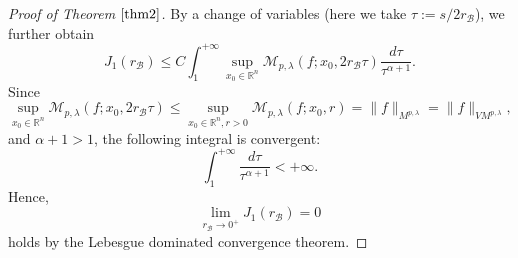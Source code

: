 \documentclass[10pt, reqno]{amsart}
\theoremstyle{definition}
\theoremstyle{remark}
\numberwithin{equation}{section}
\begin{document}
\begin{proof}[Proof of Theorem $\ref{thm2}$]
By a change of variables (here we take $\tau:=s/{2r_{\mathcal{B}}}$), we further obtain
\begin{equation*}
J_1(r_{\mathcal{B}})\leq C\int_1^{+\infty}\sup_{x_0\in\mathbb R^n}\mathcal{M}_{p,\lambda}(f;x_0,2r_{\mathcal{B}}\tau)\frac{d\tau}{\tau^{\alpha+1}}.
\end{equation*}
Since
\begin{equation*}
\sup_{x_0\in\mathbb R^n}\mathcal{M}_{p,\lambda}(f;x_0,2r_{\mathcal{B}}\tau)
\leq \sup_{x_0\in \mathbb R^n,r>0}\mathcal{M}_{p,\lambda}(f;x_0,r)=\big\|f\big\|_{{M}^{p,\lambda}}=\big\|f\big\|_{VM^{p,\lambda}},
\end{equation*}
and $\alpha+1>1$, the following integral is convergent:
\begin{equation*}
\int_1^{+\infty}\frac{d\tau}{\tau^{\alpha+1}}<+\infty.
\end{equation*}
Hence,
\begin{equation*}
\lim_{r_{\mathcal{B}}\to 0^{+}}J_1(r_{\mathcal{B}})=0
\end{equation*}
holds by the Lebesgue dominated convergence theorem.


\end{proof}
\end{document}
